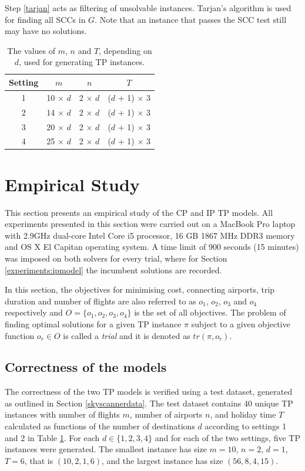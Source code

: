 \documentclass{mpaper}
\begin{document}
Step \ref{tarjan} acts as filtering of unsolvable instances. Tarjan's algorithm \cite{tarjan1972depth} is used for finding all SCCs in $G$. Note that an instance that passes the SCC test still may have no solutions.

\begin{table}
\begin{center}
\renewcommand{\arraystretch}{1.2}
\begin{tabular}{|c|c|c|c|}
\hline
Setting & $m$ & $n$ & $T$ \\
\hline
1 & 10 $\times$ $d$ & 2 $\times$ $d$ & ($d$ + 1) $\times$ 3 \\
2 & 14 $\times$ $d$ & 2 $\times$ $d$ & ($d$ + 1) $\times$ 3 \\
3 & 20 $\times$ $d$ & 2 $\times$ $d$ & ($d$ + 1) $\times$ 3 \\
4 & 25 $\times$ $d$ & 2 $\times$ $d$ & ($d$ + 1) $\times$ 3 \\
\hline
\end{tabular}
\end{center}
\caption{The values of $m$, $n$ and $T$, depending on $d$, used for generating TP instances.}
\label{table:testSize}
\end{table}

\section{Empirical Study}
\label{evaluation}
This section presents an empirical study of the CP and IP TP models. All experiments presented in this section were carried out on a MacBook Pro laptop with 2.9GHz dual-core Intel Core i5 processor, 16 GB 1867 MHz DDR3 memory and OS X El Capitan operating system. A time limit of 900 seconds (15 minutes) was imposed on both solvers for every trial, where for Section \ref{experiments:ipmodel} the incumbent solutions are recorded.

In this section, the objectives for minimising cost, connecting airports, trip duration and number of flights are also referred to as $o_1$, $o_2$, $o_3$ and $o_4$ respectively and $O = \{o_1,o_2,o_3,o_4\}$ is the set of all objectives. The problem of finding optimal solutions for a given TP instance $\pi$ subject to a given objective function $o_r \in O$ is called a \textit{trial} and it is denoted as $tr(\pi, o_r)$.

\subsection{Correctness of the models}
The correctness of the two TP models is verified using a test dataset, generated as outlined in Section \ref{skyscannerdata}. The test dataset contains 40 unique TP instances with number of flights $m$, number of airports $n$, and holiday time $T$ calculated as functions of the number of destinations $d$ according to settings 1 and 2 in Table \ref{table:testSize}. For each $d \in \{1, 2, 3, 4\}$ and for each of the two settings, five TP instances were generated. The smallest instance has size $m = 10$, $n = 2$, $d = 1$, $T = 6$, that is $(10, 2, 1, 6)$, and the largest instance has size $(56, 8, 4, 15)$.
\end{document}
